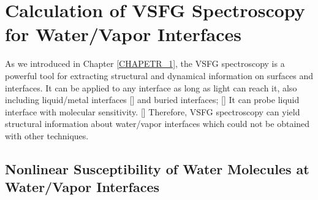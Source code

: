 \section{Calculation of VSFG Spectroscopy for Water/Vapor Interfaces}\label{section_VSFG}
As we introduced in Chapter \ref{CHAPETR_1}, the VSFG spectroscopy is a powerful tool for extracting structural and dynamical information
on surfaces and interfaces.
It can be applied to any interface as long as light can reach it, also including liquid/metal interfaces [\cite{Harris90,Harris90b,DaiHL95,Halevi96,Wieckowski99}] 
and buried interfaces; [\cite{Chen99,Chen07}]
It can probe liquid interface with molecular sensitivity. [\cite{Khatib16,Khatib16b,Khatib2017}]
Therefore, VSFG spectroscopy can yield structural information about water/vapor interfaces which could not be obtained with other techniques.

\subsection{Nonlinear Susceptibility of Water Molecules at Water/Vapor Interfaces}
